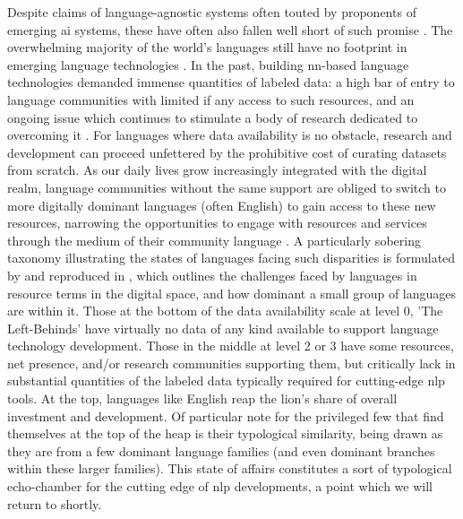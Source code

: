 \documentclass[thesis]{cluu}
\begin{document}
Despite claims of language-agnostic systems often touted by proponents of emerging \gls{ai} systems, these have often also fallen well short of such promise \parencite{benderAchievingEvaluatingLanguageIndependence2011}. The overwhelming majority of the world's languages still have no footprint in emerging language technologies \parencite{joshiStateFateLinguistic2021}. In the past, building \gls{nn}-based language technologies demanded immense quantities of labeled data: a high bar of entry to language communities with limited if any access to such resources, and an ongoing issue which continues to stimulate a body of research dedicated to overcoming it \parencite[see][for an overview]{magueresseLowresourceLanguagesReview2020}. For languages where data availability is no obstacle, research and development can proceed unfettered by the prohibitive cost of curating datasets from scratch. As our daily lives grow increasingly integrated with the digital realm, language communities without the same support are obliged to switch to more digitally dominant languages (often English) to gain access to these new resources, narrowing the opportunities to engage with resources and services through the medium of their community language \parencite{nichasaideCanWeDefuse2019}. A particularly sobering taxonomy illustrating the states of languages facing such disparities is formulated by \textcite{joshiStateFateLinguistic2021} and reproduced in , which outlines the challenges faced by languages in resource terms in the digital space, and how dominant a small group of languages are within it. Those at the bottom of the data availability scale at level 0, 'The Left-Behinds' have virtually no data of any kind available to support language technology development. Those in the middle at level 2 or 3 have some resources, net presence, and/or research communities supporting them, but critically lack in substantial quantities of the labeled data typically required for cutting-edge \gls{nlp} tools. At the top, languages like English reap the lion's share of overall investment and development. Of particular note for the privileged few that find themselves at the top of the heap is their typological similarity, being drawn as they are from a few dominant language families (and even dominant branches within these larger families). This state of affairs constitutes a sort of typological echo-chamber for the cutting edge of \gls{nlp} developments, a point which we will return to shortly.
\end{document}
